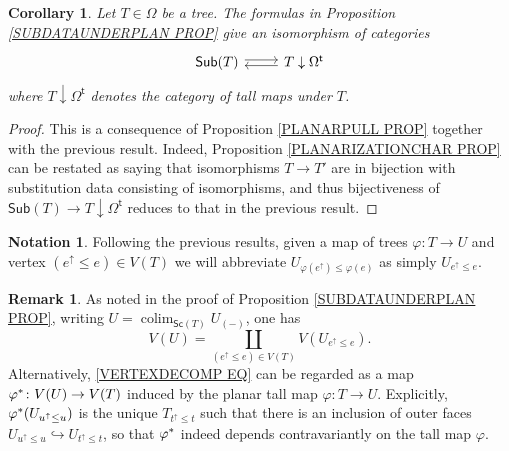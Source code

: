 \documentclass[a4paper,10pt
,draft
]{article}%
\numberwithin{equation}{section}
\numberwithin{figure}{section}
\newtheorem{corollary}[equation]{Corollary}%
\theoremstyle{definition} %
\newtheorem{remark}[equation]{Remark}%
\newtheorem{notation}[equation]{Notation}%
\DeclareMathOperator{\colim}{colim}%
\newcommand{\1}{\ensuremath{\mathbbm 1}}%
\begin{document}
\begin{corollary}\label{SUBDATAUNDERPLAN COR}
Let $T \in \Omega$ be a tree. The formulas in
Proposition \ref{SUBDATAUNDERPLAN PROP}
give an isomorphism of categories
\[
\begin{tikzcd}[row sep =0pt]
	\mathsf{Sub}(T) \ar[r,shift left=2pt] &
	T \downarrow \Omega^{\mathsf{t}} \ar[l,shift left=2pt]
\end{tikzcd}
\]
where $T \downarrow \Omega^{\mathsf{t}}$ denotes
the category of tall maps under $T$.
\end{corollary}


\begin{proof}
	This is a consequence of Proposition \ref{PLANARPULL PROP} together with the previous result.
	Indeed, Proposition \ref{PLANARIZATIONCHAR PROP} can be restated as saying that isomorphisms $T \to T'$ are in bijection with substitution data consisting of isomorphisms, and thus  bijectiveness of $\mathsf{Sub}(T) \to T \downarrow \Omega^{\mathsf{t}}$ reduces to that in the previous result.
\end{proof}



\begin{notation}\label{UEUPE NOT}
	Following the previous results, 
	given a map of trees 
	$\varphi \colon T \to U$
	and vertex
	$(e^{\uparrow} \leq e) \in V(T)$
	we will abbreviate
	$U_{\varphi(e^{\uparrow}) \leq \varphi(e)}$
	as simply
	$U_{e^{\uparrow} \leq e}$.
\end{notation}


\begin{remark}\label{VERTEXDECOMP REM}
As noted in the proof of Proposition \ref{SUBDATAUNDERPLAN PROP}, writing $U = \colim_{\mathsf{Sc}(T)}U_{(\minus)}$,
	one has 
\begin{equation}\label{VERTEXDECOMP EQ}
	V(U) = \coprod_{(e^{\uparrow} \leq e) \in V(T)}
	V(U_{e^{\uparrow} \leq e}).
  \end{equation}
    Alternatively, \eqref{VERTEXDECOMP EQ} can be regarded as a map 
    $\varphi^{\**} \colon V(U) \to V(T)$ induced by the planar tall map 
    $\varphi \colon T \to U$.
    Explicitly, $\varphi^{\**}(U_{u^{\uparrow} \leq u})$ 
    is the unique $T_{t^{\uparrow}\leq t}$ such that
    there is an inclusion of outer faces $U_{u^{\uparrow} \leq u} \hookrightarrow U_{t^{\uparrow} \leq t}$,
    so that $\varphi^{\**}$ indeed depends contravariantly on the tall map $\varphi$.
\end{remark}
\end{document}
